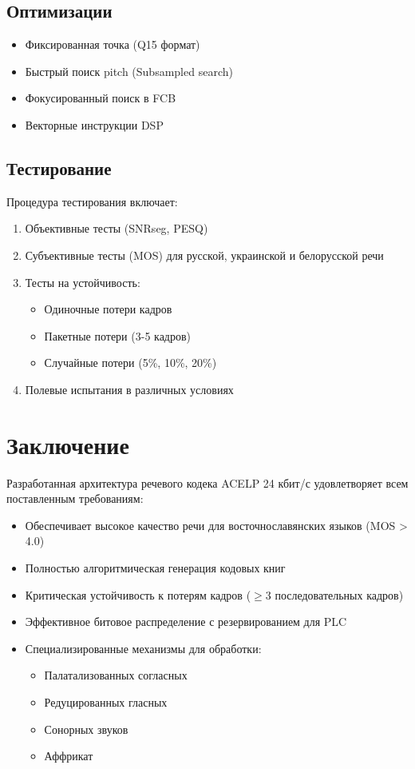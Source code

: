 \documentclass{report}
\begin{document}
	\section{Оптимизации}
	\begin{itemize}
		\item Фиксированная точка (Q15 формат)
		\item Быстрый поиск pitch (Subsampled search)
		\item Фокусированный поиск в FCB
		\item Векторные инструкции DSP
	\end{itemize}
	
	\section{Тестирование}
	Процедура тестирования включает:
	\begin{enumerate}
		\item Объективные тесты (SNRseg, PESQ)
		\item Субъективные тесты (MOS) для русской, украинской и белорусской речи
		\item Тесты на устойчивость:
		\begin{itemize}
			\item Одиночные потери кадров
			\item Пакетные потери (3-5 кадров)
			\item Случайные потери (5\%, 10\%, 20\%)
		\end{itemize}
		\item Полевые испытания в различных условиях
	\end{enumerate}
	
	\chapter*{Заключение}
	Разработанная архитектура речевого кодека ACELP 24 кбит/с удовлетворяет всем поставленным требованиям:
	\begin{itemize}
		\item Обеспечивает высокое качество речи для восточнославянских языков (MOS > 4.0)
		\item Полностью алгоритмическая генерация кодовых книг
		\item Критическая устойчивость к потерям кадров ($\geqslant$3 последовательных кадров)
		\item Эффективное битовое распределение с резервированием для PLC
		\item Специализированные механизмы для обработки:
		\begin{itemize}
			\item Палатализованных согласных
			\item Редуцированных гласных
			\item Сонорных звуков
			\item Аффрикат
		\end{itemize}
	\end{itemize}
	
\end{document}
